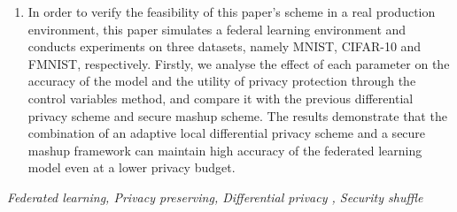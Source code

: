 \begin{enumerate}
	\item In order to verify the feasibility of this paper's scheme in a real production environment, this paper simulates a federal learning environment and conducts experiments on three datasets, namely MNIST, CIFAR-10 and FMNIST, respectively. Firstly, we analyse the effect of each parameter on the accuracy of the model and the utility of privacy protection through the control variables method, and compare it with the previous differential privacy scheme and secure mashup scheme. The results demonstrate that the combination of an adaptive local differential privacy scheme and a secure mashup framework can maintain high accuracy of the federated learning model even at a lower privacy budget.
\end{enumerate}
{} \textit{Federated learning, Privacy preserving, Differential privacy , Security shuffle}


